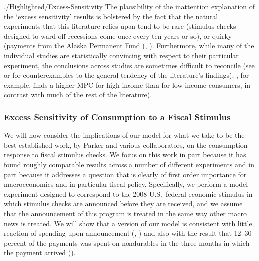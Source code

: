 \begin{verbatimwrite}{./Highlighted/Excess-Sensitivity}
The plausibility of the inattention explanation of the `excess sensitivity' results is bolstered by the fact that the natural experiments that this literature relies upon tend to be rare (stimulus checks designed to ward off recessions come once every ten years or so), or quirky (payments from the Alaska Permanent Fund (\cite{hsiehAlaska}, \cite{kuengAlaska}).  Furthermore, while many of the individual studies are statistically convincing with respect to their particular experiment, the conclusions across studies are sometimes difficult to reconcile (see \cite{hsiehAlaska} or \cite{CoulibalyLiMortgage} for counterexamples to the general tendency of the literature's findings); \cite{kuengAlaska}, for example, finds a higher MPC for high-income than for low-income consumers, in contrast with much of the rest of the literature).


\hypertarget{Excess-Sensitivity-Experiment}{}
\subsubsection{Excess Sensitivity of Consumption to a Fiscal Stimulus}

We will now consider the implications of our model for what we take to be the best-established work, by Parker and various collaborators, on the consumption response to fiscal stimulus checks. We focus on this work in part because it has found roughly comparable results across a number of different experiments and in part because it addresses a question that is clearly of first order importance for macroeconomics and in particular fiscal policy. Specifically, we perform a model experiment designed to correspond to the 2008 U.S.\ federal economic stimulus in which stimulus checks are announced before they are received, and we assume that the announcement of this program is treated in the same way other macro news is treated. We will show that a version of our model is consistent with little reaction of spending upon announcement (\cite{brodaParker}, \cite{parker25million}) and also with the result that 12--30 percent of the payments was spent on nondurables in the three months in which the payment arrived (\cite{psjmMPC2008}).



\end{verbatimwrite}
